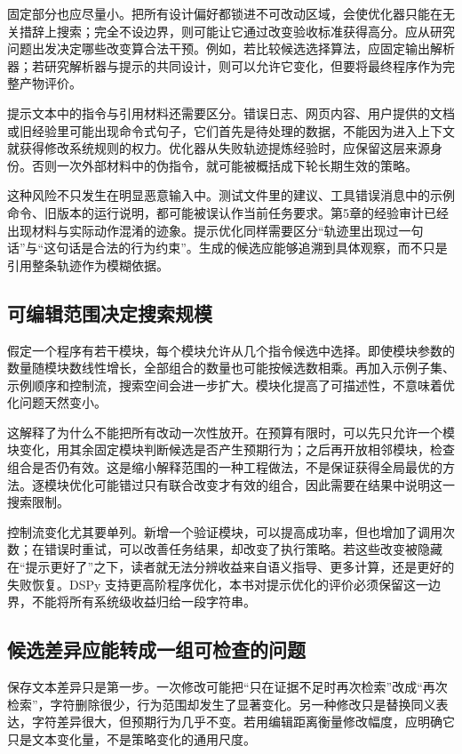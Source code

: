 固定部分也应尽量小。把所有设计偏好都锁进不可改动区域，会使优化器只能在无关措辞上搜索；完全不设边界，则可能让它通过改变验收标准获得高分。应从研究问题出发决定哪些改变算合法干预。例如，若比较候选选择算法，应固定输出解析器；若研究解析器与提示的共同设计，则可以允许它变化，但要将最终程序作为完整产物评价。

提示文本中的指令与引用材料还需要区分。错误日志、网页内容、用户提供的文档或旧经验里可能出现命令式句子，它们首先是待处理的数据，不能因为进入上下文就获得修改系统规则的权力。优化器从失败轨迹提炼经验时，应保留这层来源身份。否则一次外部材料中的伪指令，就可能被概括成下轮长期生效的策略。

这种风险不只发生在明显恶意输入中。测试文件里的建议、工具错误消息中的示例命令、旧版本的运行说明，都可能被误认作当前任务要求。第5章的经验审计已经出现材料与实际动作混淆的迹象。提示优化同样需要区分“轨迹里出现过一句话”与“这句话是合法的行为约束”。生成的候选应能够追溯到具体观察，而不只是引用整条轨迹作为模糊依据。

\subsection{可编辑范围决定搜索规模}

假定一个程序有若干模块，每个模块允许从几个指令候选中选择。即使模块参数的数量随模块数线性增长，全部组合的数量也可能按候选数相乘。再加入示例子集、示例顺序和控制流，搜索空间会进一步扩大。模块化提高了可描述性，不意味着优化问题天然变小。

这解释了为什么不能把所有改动一次性放开。在预算有限时，可以先只允许一个模块变化，用其余固定模块判断候选是否产生预期行为；之后再开放相邻模块，检查组合是否仍有效。这是缩小解释范围的一种工程做法，不是保证获得全局最优的方法。逐模块优化可能错过只有联合改变才有效的组合，因此需要在结果中说明这一搜索限制。

控制流变化尤其要单列。新增一个验证模块，可以提高成功率，但也增加了调用次数；在错误时重试，可以改善任务结果，却改变了执行策略。若这些改变被隐藏在“提示更好了”之下，读者就无法分辨收益来自语义指导、更多计算，还是更好的失败恢复。DSPy 支持更高阶程序优化，本书对提示优化的评价必须保留这一边界，不能将所有系统级收益归给一段字符串。

\subsection{候选差异应能转成一组可检查的问题}

保存文本差异只是第一步。一次修改可能把“只在证据不足时再次检索”改成“再次检索”，字符删除很少，行为范围却发生了显著变化。另一种修改只是替换同义表达，字符差异很大，但预期行为几乎不变。若用编辑距离衡量修改幅度，应明确它只是文本变化量，不是策略变化的通用尺度。


